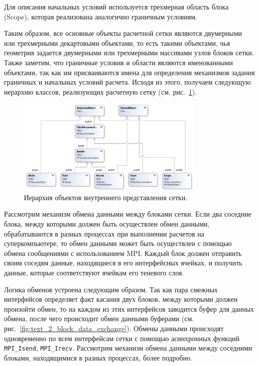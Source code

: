Для описания начальных условий используется трехмерная область блока (Scope), которая реализована аналогично граничным условиям.

Таким образом, все основные объекты расчетной сетки являются двумерными или трехмерными декартовыми объектами, то есть такими объектами, чья геометрия задается двумерными или трехмерными массивами узлов блоков сетки.
Также заметим, что граничные условия и области являются именованными объектами, так как им присваиваются имена для определения механизмов задания граничных и начальных условий расчета.
Исходя из этого, получаем следующую иерархию классов, реализующих расчетную сетку (см. рис.~\ref{fig:text_2_block_hierarchy}).

\begin{figure}[ht]
\centering
\includegraphics[width=0.8\textwidth]{fig/par_9-hierarchy.png}
\singlespacing
{}\caption{Иерархия объектов внутреннего представления сетки.}
\label{fig:text_2_block_hierarchy}
\end{figure}

Рассмотрим механизм обмена данными между блоками сетки.
Если два соседние блока, между которыми должен быть осуществлен обмен данными, обрабатываются в разных процессах при выполнении расчетов на суперкомпьютере, то обмен данными может быть осуществлен с помощью обмена сообщениями с использованием MPI\label{abbr:mpi-2}.
Каждый блок должен отправить своим соседям данные, находящиеся в его интерфейсных ячейках, и получить данные, которые соответствуют ячейкам его теневого слоя.

Логика обменов устроена следующим образом.
Так как пара смежных интерфейсов определяет факт касания двух блоков, между которыми должен произойти обмен, то на каждом из этих интерфейсов заводится буфер для данных обмена, после чего происходит обмен данными буферами (см. рис.~\ref{fig:text_2_block_data_exchange}).
Обмены данными происходят одновременно по всем интерфейсам сетки с помощью асинхронных функций
\texttt{MPI\_Isend}, \texttt{MPI\_Irecv}.
Рассмотрим механизм обмена данными между соседними блоками, находящимися в разных процессах, более подробно.


